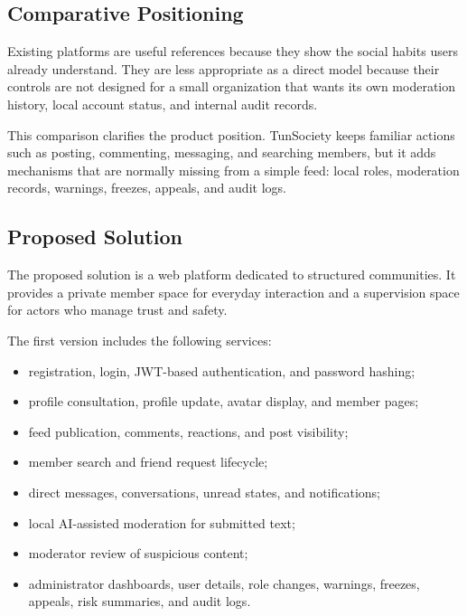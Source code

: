 \subsection{Comparative Positioning}

Existing platforms are useful references because they show the social habits users already understand. They are less appropriate as a direct model because their controls are not designed for a small organization that wants its own moderation history, local account status, and internal audit records.



This comparison clarifies the product position. TunSociety keeps familiar actions such as posting, commenting, messaging, and searching members, but it adds mechanisms that are normally missing from a simple feed: local roles, moderation records, warnings, freezes, appeals, and audit logs.

\subsection{Proposed Solution}

The proposed solution is a web platform dedicated to structured communities. It provides a private member space for everyday interaction and a supervision space for actors who manage trust and safety.

The first version includes the following services:

\begin{itemize}
    \item registration, login, JWT-based authentication, and password hashing;
    \item profile consultation, profile update, avatar display, and member pages;
    \item feed publication, comments, reactions, and post visibility;
    \item member search and friend request lifecycle;
    \item direct messages, conversations, unread states, and notifications;
    \item local AI-assisted moderation for submitted text;
    \item moderator review of suspicious content;
    \item administrator dashboards, user details, role changes, warnings, freezes, appeals, risk summaries, and audit logs.
\end{itemize}

